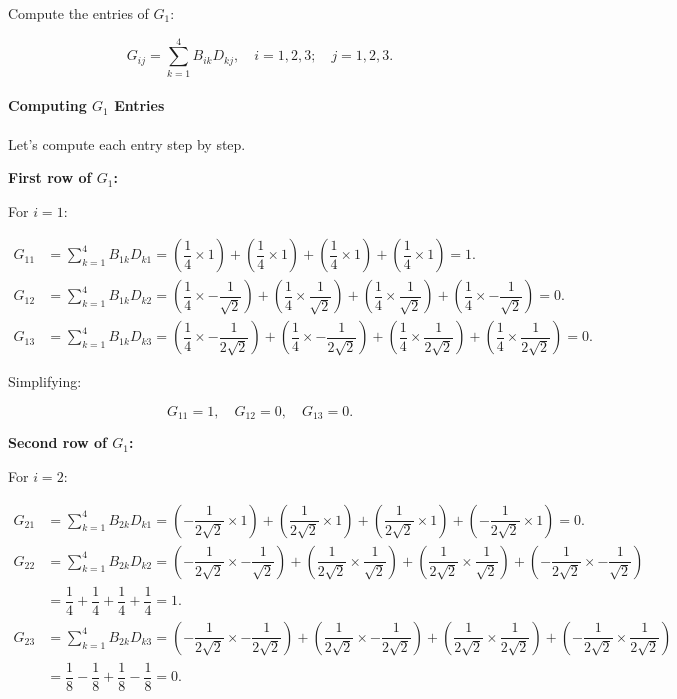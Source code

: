 \documentclass[class=article, crop=false]{standalone}
\begin{document}
Compute the entries of $G_1$:

\[
G_{ij} = \sum_{k=1}^{4} B_{ik} D_{kj}, \quad i = 1,2,3; \quad j = 1,2,3.
\]

\paragraph{Computing $G_1$ Entries}

Let's compute each entry step by step.

\textbf{First row of $G_1$:}

For $i = 1$:

\[
\begin{aligned}
G_{11} &= \sum_{k=1}^{4} B_{1k} D_{k1} = \left( \dfrac{1}{4} \times 1 \right) + \left( \dfrac{1}{4} \times 1 \right) + \left( \dfrac{1}{4} \times 1 \right) + \left( \dfrac{1}{4} \times 1 \right) = 1. \\
G_{12} &= \sum_{k=1}^{4} B_{1k} D_{k2} = \left( \dfrac{1}{4} \times -\dfrac{1}{\sqrt{2}} \right) + \left( \dfrac{1}{4} \times \dfrac{1}{\sqrt{2}} \right) + \left( \dfrac{1}{4} \times \dfrac{1}{\sqrt{2}} \right) + \left( \dfrac{1}{4} \times -\dfrac{1}{\sqrt{2}} \right) = 0. \\
G_{13} &= \sum_{k=1}^{4} B_{1k} D_{k3} = \left( \dfrac{1}{4} \times -\dfrac{1}{2\sqrt{2}} \right) + \left( \dfrac{1}{4} \times -\dfrac{1}{2\sqrt{2}} \right) + \left( \dfrac{1}{4} \times \dfrac{1}{2\sqrt{2}} \right) + \left( \dfrac{1}{4} \times \dfrac{1}{2\sqrt{2}} \right) = 0.
\end{aligned}
\]

Simplifying:

\[
G_{11} = 1, \quad G_{12} = 0, \quad G_{13} = 0.
\]

\textbf{Second row of $G_1$:}

For $i = 2$:

\[
\begin{aligned}
G_{21} &= \sum_{k=1}^{4} B_{2k} D_{k1} = \left( -\dfrac{1}{2\sqrt{2}} \times 1 \right) + \left( \dfrac{1}{2\sqrt{2}} \times 1 \right) + \left( \dfrac{1}{2\sqrt{2}} \times 1 \right) + \left( -\dfrac{1}{2\sqrt{2}} \times 1 \right) = 0. \\
G_{22} &= \sum_{k=1}^{4} B_{2k} D_{k2} = \left( -\dfrac{1}{2\sqrt{2}} \times -\dfrac{1}{\sqrt{2}} \right) + \left( \dfrac{1}{2\sqrt{2}} \times \dfrac{1}{\sqrt{2}} \right) + \left( \dfrac{1}{2\sqrt{2}} \times \dfrac{1}{\sqrt{2}} \right) + \left( -\dfrac{1}{2\sqrt{2}} \times -\dfrac{1}{\sqrt{2}} \right) \\
&= \dfrac{1}{4} + \dfrac{1}{4} + \dfrac{1}{4} + \dfrac{1}{4} = 1. \\
G_{23} &= \sum_{k=1}^{4} B_{2k} D_{k3} = \left( -\dfrac{1}{2\sqrt{2}} \times -\dfrac{1}{2\sqrt{2}} \right) + \left( \dfrac{1}{2\sqrt{2}} \times -\dfrac{1}{2\sqrt{2}} \right) + \left( \dfrac{1}{2\sqrt{2}} \times \dfrac{1}{2\sqrt{2}} \right) + \left( -\dfrac{1}{2\sqrt{2}} \times \dfrac{1}{2\sqrt{2}} \right) \\
&= \dfrac{1}{8} - \dfrac{1}{8} + \dfrac{1}{8} - \dfrac{1}{8} = 0.
\end{aligned}
\]
\end{document}
